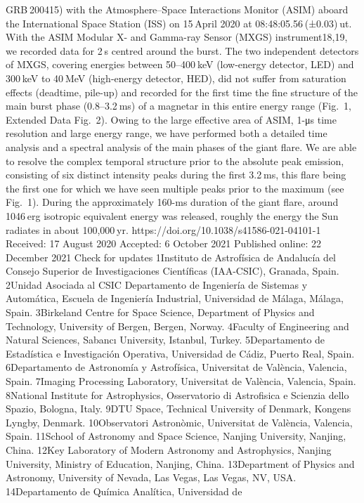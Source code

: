GRB 200415) with the Atmosphere–Space Interactions Monitor
(ASIM) aboard the International Space Station (ISS) on 15 April 2020
at 08:48:05.56 (±0.03) ut. With the ASIM Modular X- and Gamma-ray
Sensor (MXGS) instrument18,19, we recorded data for 2 s centred around
the burst. The two independent detectors of MXGS, covering energies
between 50–400 keV (low-energy detector, LED) and 300 keV to 40 MeV
(high-energy detector, HED), did not suffer from saturation effects
(deadtime, pile-up) and recorded for the first time the fine structure
of the main burst phase (0.8–3.2 ms) of a magnetar in this entire energy
range (Fig. 1, Extended Data Fig. 2). Owing to the large effective area of
ASIM, 1-μs time resolution and large energy range, we have performed
both a detailed time analysis and a spectral analysis of the main phases
of the giant flare. We are able to resolve the complex temporal structure
prior to the absolute peak emission, consisting of six distinct intensity
peaks during the first 3.2 ms, this flare being the first one for which we
have seen multiple peaks prior to the maximum (see Fig. 1). During
the approximately 160-ms duration of the giant flare, around 1046 erg
isotropic equivalent energy was released, roughly the energy the Sun
radiates in about 100,000 yr.
https://doi.org/10.1038/s41586-021-04101-1
Received: 17 August 2020
Accepted: 6 October 2021
Published online: 22 December 2021
 Check for updates
1Instituto de Astrofísica de Andalucía del Consejo Superior de Investigaciones Científicas (IAA-CSIC), Granada, Spain. 2Unidad Asociada al CSIC Departamento de Ingeniería de Sistemas y
Automática, Escuela de Ingeniería Industrial, Universidad de Málaga, Málaga, Spain. 3Birkeland Centre for Space Science, Department of Physics and Technology, University of Bergen, Bergen,
Norway. 4Faculty of Engineering and Natural Sciences, Sabancı University, Istanbul, Turkey. 5Departamento de Estadística e Investigación Operativa, Universidad de Cádiz, Puerto Real, Spain.
6Departamento de Astronomía y Astrofísica, Universitat de València, Valencia, Spain. 7Imaging Processing Laboratory, Universitat de València, Valencia, Spain. 8National Institute for
Astrophysics, Osservatorio di Astrofisica e Scienzia dello Spazio, Bologna, Italy. 9DTU Space, Technical University of Denmark, Kongens Lyngby, Denmark. 10Observatori Astronòmic, Universitat
de València, Valencia, Spain. 11School of Astronomy and Space Science, Nanjing University, Nanjing, China. 12Key Laboratory of Modern Astronomy and Astrophysics, Nanjing University,
Ministry of Education, Nanjing, China. 13Department of Physics and Astronomy, University of Nevada, Las Vegas, Las Vegas, NV, USA. 14Departamento de Química Analítica, Universidad de
